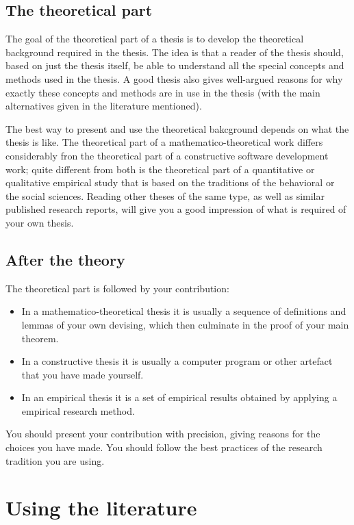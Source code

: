\documentclass[utf8,english]{gradu3}
\begin{document}
\section{The theoretical part}

The goal of the theoretical part of a thesis is to develop the
theoretical background required in the thesis.  The idea is that a
reader of the thesis should, based on just the thesis itself, be able
to understand all the special concepts and methods used in the thesis.
A good thesis also gives well-argued reasons for why exactly these
concepts and methods are in use in the thesis (with the main
alternatives given in the literature mentioned).

The best way to present and use the theoretical bakcground depends on
what the thesis is like.  The theoretical part of a
mathematico-theoretical work differs considerably fron the theoretical
part of a constructive software development work; quite different from
both is the theoretical part of a quantitative or qualitative
empirical study that is based on the traditions of the behavioral or
the social sciences.  Reading other theses of the same type, as well
as similar published research reports, will give you a good impression
of what is required of your own thesis.

\section{After the theory}

The theoretical part is followed by your contribution:
\begin{itemize}
\item In a mathematico-theoretical thesis it is usually a sequence of
  definitions and lemmas of your own devising, which then culminate in
  the proof of your main theorem.
\item In a constructive thesis it is usually a computer program or
  other artefact that you have made yourself.
\item In an empirical thesis it is a set of empirical results obtained
  by applying a empirical research method.
\end{itemize}

You should present your contribution with precision, giving reasons
for the choices you have made.  You should follow the best practices
of the research tradition you are using.

\chapter{Using the literature}
\end{document}
